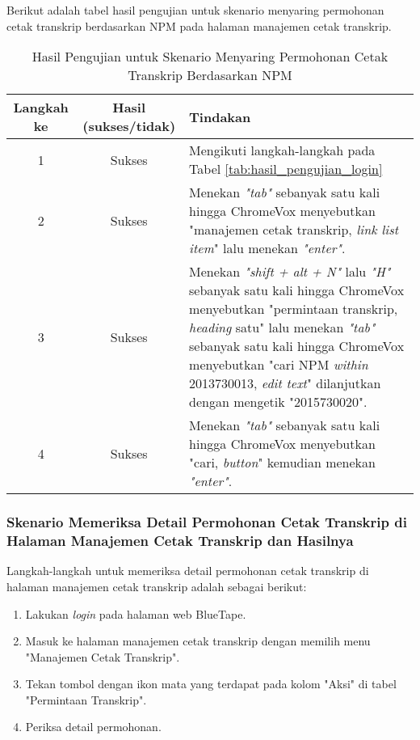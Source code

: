 Berikut adalah tabel hasil pengujian untuk skenario menyaring permohonan cetak transkrip berdasarkan NPM pada halaman manajemen cetak transkrip.

\begin{table}[H]
    \centering 
    \caption{Hasil Pengujian untuk Skenario Menyaring Permohonan Cetak Transkrip Berdasarkan NPM}
    \label{tab:hasil_pengujian_menyaring_permohonan_cetak_transkrip_berdasarkan_npm}
    \begin{tabular}{|c|c|p{10cm}|}
        \toprule
        Langkah ke & Hasil (sukses/tidak) & Tindakan \\

        \midrule
        1 & Sukses & Mengikuti langkah-langkah pada Tabel \ref{tab:hasil_pengujian_login} \\
        2 & Sukses & Menekan \textit{"tab"} sebanyak satu kali hingga ChromeVox menyebutkan "manajemen cetak transkrip, \textit{link list item}" lalu menekan \textit{"enter"}. \\
        3 & Sukses & Menekan \textit{"shift + alt + N"} lalu \textit{"H"} sebanyak satu kali hingga ChromeVox menyebutkan "permintaan transkrip, \textit{heading} satu" lalu menekan \textit{"tab"} sebanyak satu kali hingga ChromeVox menyebutkan "cari NPM \textit{within} 2013730013, \textit{edit text}" dilanjutkan dengan mengetik "2015730020". \\
        4 & Sukses & Menekan \textit{"tab"} sebanyak satu kali hingga ChromeVox menyebutkan "cari, \textit{button}" kemudian menekan \textit{"enter"}. \\

        \bottomrule

    \end{tabular}
\end{table}

\subsubsection{Skenario Memeriksa Detail Permohonan Cetak Transkrip di Halaman Manajemen Cetak Transkrip dan Hasilnya}
\label{subsubsec:skenario_memeriksa_detail_permohonan_cetak_transkrip_di_halaman_manajemen_cetak_transkrip}
Langkah-langkah untuk memeriksa detail permohonan cetak transkrip di halaman manajemen cetak transkrip adalah sebagai berikut:

\begin{enumerate}
    \item Lakukan \textit{login} pada halaman web BlueTape.
    \item Masuk ke halaman manajemen cetak transkrip dengan memilih menu "Manajemen Cetak Transkrip".
    \item Tekan tombol dengan ikon mata yang terdapat pada kolom "Aksi" di tabel "Permintaan Transkrip".
    \item Periksa detail permohonan.
\end{enumerate}

